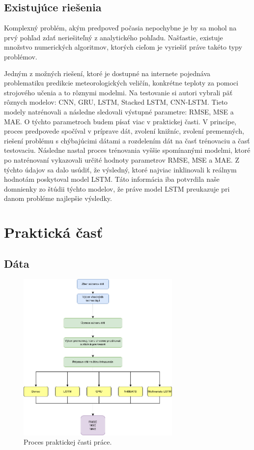 \newpage

\subsection{Existujúce riešenia}
Komplexný problém, akým predpoveď počasia nepochybne je by sa mohol na prvý pohľad zdať neriešiteľný z analytického pohľadu. Našťastie, existuje množstvo numerických algoritmov, ktorých cieľom je vyriešiť práve takéto typy problémov. 

Jedným z možných riešení, ktoré je dostupné na internete pojednáva problematiku predikcie meteorologických veličín, konkrétne teploty za pomoci strojového učenia a to rôznymi modelmi. Na testovanie si autori vybrali päť rôznych modelov: CNN, GRU, LSTM, Stacked LSTM, CNN-LSTM. Tieto modely natrénovali a následne sledovali výstupné parametre: RMSE, MSE a MAE. O týchto parametroch budem písať viac v praktickej časti. V princípe, proces predpovede spočíval v príprave dát, zvolení knižníc, zvolení premenných, riešení problému s chýbajúcimi dátami a rozdelením dát na časť trénovaciu a časť testovaciu. Následne nastal proces trénovania vyššie spomínanými modelmi, ktoré po natrénovaní vykazovali určité hodnoty parametrov RMSE, MSE a MAE. Z týchto údajov sa dalo usúdiť, že výsledný, ktoré najviac inklinovali k reálnym hodnotám poskytoval model LSTM. Táto informácia iba potvrdila naše domnienky zo štúdii týchto modelov, že práve model LSTM preukazuje pri danom probléme najlepšie výsledky. 

\section{Praktická časť}

\subsection{Dáta}



\begin{figure}[!htbp]
  \centering
  \includegraphics[width=8cm]{img/multivariate LSTM Diagram.drawio (1).png}
  \caption{Proces praktickej časti práce.}
  \label{workflow}
\end{figure}

